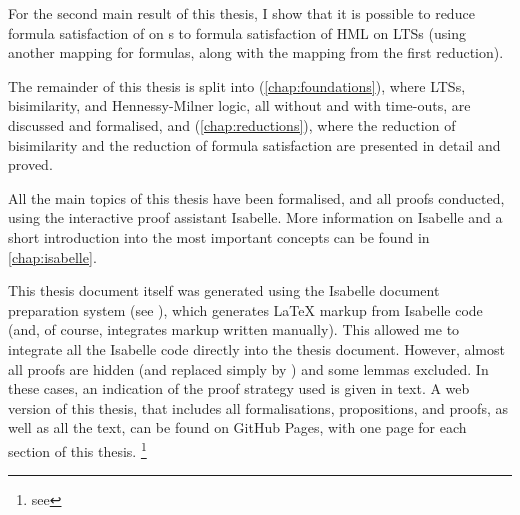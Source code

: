\begin{isabellebody}
\begin{isamarkuptext}
For the second main result of this thesis, I show that it is possible to reduce formula satisfaction of \HMLt{} on \LTSt{}s to formula satisfaction of HML on LTSs (using another mapping for formulas, along with the mapping from the first reduction).%
\end{isamarkuptext}\isamarkuptrue%
%
\isadelimdocument
%
\endisadelimdocument
%
\isatagdocument
%
\isamarkuptrue%
%
\endisatagdocument
{\isafolddocument}%
%
\isadelimdocument
%
\endisadelimdocument
%
\begin{isamarkuptext}%
The remainder of this thesis is split into  (\cref{chap:foundations}), where LTSs, bisimilarity, and Hennessy-Milner logic, all without and with time-outs, are discussed and formalised, and  (\cref{chap:reductions}), where the reduction of bisimilarity and the reduction of formula satisfaction are presented in detail and proved.

All the main topics of this thesis have been formalised, and all proofs conducted, using the interactive proof assistant Isabelle. More information on Isabelle and a short introduction into the most important concepts can be found in \cref{chap:isabelle}.

This thesis document itself was generated using the Isabelle document preparation system (see \cite{isa_system}), which generates \LaTeX{} markup from Isabelle code (and, of course, integrates markup written manually). This allowed me to integrate all the Isabelle code directly into the thesis document.
However, almost all proofs are hidden (and replaced simply by \isa{{\isasymproof}}) and some lemmas excluded. In these cases, an indication of the proof strategy used is given in text. A web version of this thesis, that includes all formalisations, propositions, and proofs, as well as all the text, can be found on GitHub Pages, with one page for each section of this thesis.%
\footnote{see }


\end{isamarkuptext}
\end{isabellebody}
